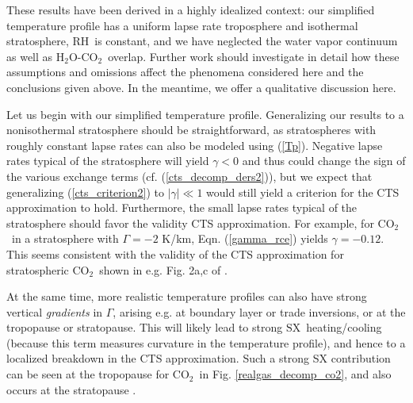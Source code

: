 \documentclass{ametsoc}
\newcommand{\eqnref}[1]{(\ref{#1})}
\newcommand{\cotwo}{\ensuremath{\mathrm{CO_2}}}
\newcommand{\htwo}{\ensuremath{\mathrm{H_2O}}}
\newcommand{\RH}{\ensuremath{\mathrm{RH}}}
\newcommand{\taus}{\ensuremath{\tau_s}}
\newcommand{\SX}{\ensuremath{\mathrm{SX}}}
\newcommand{\AX}{\ensuremath{\mathrm{AX}}}
\newcommand{\CTS}{\ensuremath{\mathrm{CTS}}}
\newcommand{\PRE}{\ensuremath{\mathrm{PRE}}}
\begin{document}

These results have been derived in a highly idealized context: our simplified temperature profile has a uniform lapse rate troposphere and isothermal stratosphere, \RH\ is constant, and we have neglected the water vapor continuum as well as \htwo-\cotwo\ overlap. Further work should investigate in detail how these assumptions and omissions affect the phenomena considered here and the conclusions given above. In the meantime, we offer a qualitative discussion here.

Let us begin with our simplified temperature profile. Generalizing our results to a nonisothermal stratosphere should be straightforward, as stratospheres with roughly constant lapse rates can also be modeled using \eqnref{Tp}. Negative lapse rates typical of the stratosphere will yield $\gamma<0$ and thus could change the sign of the various exchange terms (cf. \eqnref{cts_decomp_ders2}), but we expect that generalizing \eqnref{cts_criterion2} to $|\gamma| \ll 1$ would still yield a criterion for the CTS approximation to hold. Furthermore, the small lapse rates typical of the stratosphere should favor the validity CTS approximation.  For example, for \cotwo\ in a stratosphere with $\Gamma = -2$ K/km, Eqn. \eqnref{gamma_rce} yields $\gamma = -0.12$. This seems consistent with the validity of the CTS approximation for stratospheric \cotwo\ shown in e.g. Fig. 2a,c of \cite{rodgers1966}.

At the same time, more realistic temperature profiles can also have strong vertical \emph{gradients} in $\Gamma$, arising e.g. at boundary layer or trade inversions, or at the tropopause or stratopause. This will likely lead to strong \SX\ heating/cooling (because this term measures curvature in the temperature profile), and hence to a localized breakdown in  the CTS approximation. Such a strong SX contribution can be seen  at the tropopause for \cotwo\ in Fig. \ref{realgas_decomp_co2}, and also occurs at the stratopause \citep[e.g.][]{clough1995,zhu1992}. 
\end{document}
